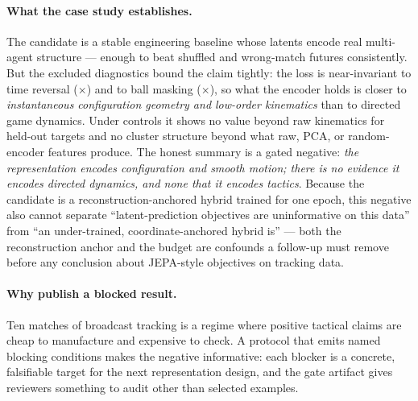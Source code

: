\documentclass{article}
\begin{document}
\paragraph{What the case study establishes.}
The candidate is a stable engineering baseline whose latents encode real
multi-agent structure --- enough to beat shuffled and wrong-match futures
consistently. But the excluded diagnostics bound the claim tightly: the loss
is near-invariant to time reversal (\FalsReversedTimeMeanRatio$\times$) and to
ball masking (\FalsMaskedBallMeanRatio$\times$), so what the encoder holds is
closer to \emph{instantaneous configuration geometry and low-order
kinematics} than to directed game dynamics. Under controls it shows no value
beyond raw kinematics for held-out targets and no cluster structure beyond
what raw, PCA, or random-encoder features produce. The honest summary is a
gated negative: \emph{the representation encodes configuration and smooth
motion; there is no evidence it encodes directed dynamics, and none that it
encodes tactics}. Because the candidate is a reconstruction-anchored hybrid
trained for one epoch, this negative also cannot separate ``latent-prediction
objectives are uninformative on this data'' from ``an under-trained,
coordinate-anchored hybrid is'' --- both the reconstruction anchor and the
budget are confounds a follow-up must remove before any conclusion about
JEPA-style objectives on tracking data.

\paragraph{Why publish a blocked result.}
Ten matches of broadcast tracking is a regime where positive tactical claims
are cheap to manufacture and expensive to check. A protocol that emits named
blocking conditions makes the negative informative: each blocker is a concrete,
falsifiable target for the next representation design, and the gate artifact
gives reviewers something to audit other than selected examples.
\end{document}
